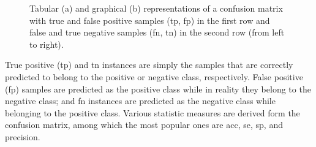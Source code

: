 \begin{figure}[t]
{  \subfloat[]{
    \label{fig:evaluation-confusion_matrix}
    \begin{tikzpicture}[scale=0.4]
      \node at (0,0){
        \begin{tabular}{
            >{\centering}m{1em} >{\centering}m{1em} >{\centering}m{1in} >{\centering\arraybackslash}m{1in}}
          & & \multicolumn{2}{c}{ Actual Class }\\
          & & A+ & A- \\
          \multirow{3}{*}{\rotatebox[origin=c]{90}{Predicted Class}}& P+ &  \tikz{\tp} & \tikz{\fp} \\
          & P- & \tikz{\fn} & \tikz{\tn}
        \end{tabular}
      };
    \end{tikzpicture}
  }
  }
  \caption[Confusion matrix]{Tabular (a) and graphical (b) representations of a confusion matrix with true and false positive samples (\acs{tp}, \acs{fp}) in the first row and false and true negative samples (\acs{fn}, \acs{tn}) in the second row (from left to right).}
  \label{fig:CM}
\end{figure}
True positive (\ac{tp}) and \acf{tn} instances are simply the samples that are correctly predicted to belong to the positive or negative class, respectively.
False positive (\ac{fp}) samples are predicted as the positive class while in reality they belong to the negative class; and \acf{fn} instances are predicted as the negative class while belonging to the positive class.
Various statistic measures are derived form the confusion matrix, among which the most popular ones are \acf{acc}, \acf{se}, \acf{sp}, and precision.

